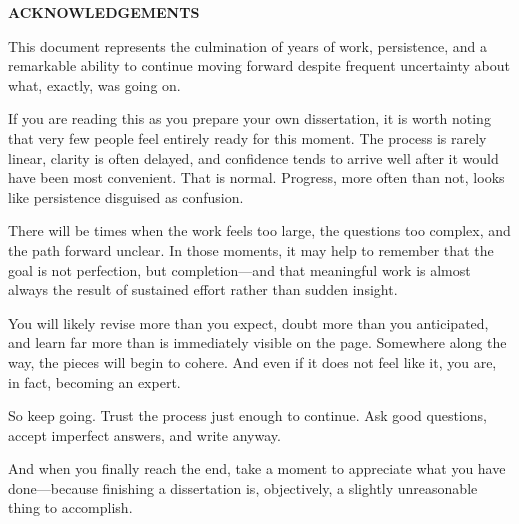 
\begin{center}
\vspace*{52pt}
{\normalfont \textbf{ACKNOWLEDGEMENTS}}
\end{center}

This document represents the culmination of years of work, persistence, and a remarkable ability to continue moving forward despite frequent uncertainty about what, exactly, was going on.

If you are reading this as you prepare your own dissertation, it is worth noting that very few people feel entirely ready for this moment. The process is rarely linear, clarity is often delayed, and confidence tends to arrive well after it would have been most convenient. That is normal. Progress, more often than not, looks like persistence disguised as confusion.

There will be times when the work feels too large, the questions too complex, and the path forward unclear. In those moments, it may help to remember that the goal is not perfection, but completion—and that meaningful work is almost always the result of sustained effort rather than sudden insight.

You will likely revise more than you expect, doubt more than you anticipated, and learn far more than is immediately visible on the page. Somewhere along the way, the pieces will begin to cohere. And even if it does not feel like it, you are, in fact, becoming an expert.

So keep going. Trust the process just enough to continue. Ask good questions, accept imperfect answers, and write anyway.

And when you finally reach the end, take a moment to appreciate what you have done—because finishing a dissertation is, objectively, a slightly unreasonable thing to accomplish.

\clearpage
